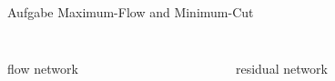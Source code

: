 \begin{frame}[allowframebreaks]{Aufgabe \thesection}{Maximum-Flow and Minimum-Cut}
\begin{solution}
\begin{columns}
\begin{column}{0.5\textwidth}
{        }
      \end{column}
    \end{columns}
  \end{solution}
  \begin{solution}
    \begin{columns}
      \begin{column}{0.5\textwidth}
      \end{column}
      \begin{column}{0.5\textwidth}
      \end{column}
    \end{columns}
  \end{solution}
  \begin{solutionnoinc}
    \begin{columns}
      \begin{column}{0.5\textwidth}
        \centering\scriptsize
        flow network
      \end{column}
      \begin{column}{0.5\textwidth}
        \centering\scriptsize
        residual network
      \end{column}
    \end{columns}
  \end{solutionnoinc}
  \begin{solutionnoinc}
    \begin{columns}
      \begin{column}{0.5\textwidth}
          \resizebox{\textwidth}{!}{
            \begin{minipage}[t]{14cm}


\end{minipage}}
\end{column}
\end{columns}
\end{solutionnoinc}
\end{frame}
